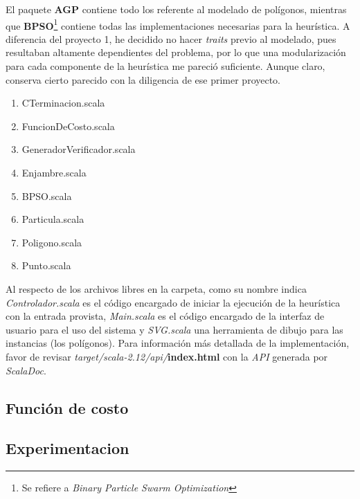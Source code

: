 \documentclass[12pt]{article}
\begin{document}
El paquete \textbf{AGP} contiene todo los referente al modelado de polígonos, mientras que \textbf{BPSO}\footnote{Se refiere a \textit{Binary Particle Swarm Optimization}} contiene todas las implementaciones necesarias para la heurística.
A diferencia del proyecto 1, he decidido no hacer \textit{traits} previo al modelado, pues resultaban
altamente dependientes del problema, por lo que una modularización para cada componente de la heurística me pareció suficiente. Aunque claro, conserva cierto parecido con la diligencia de ese primer proyecto.

\begin{multicols}{2}
\begin{enumerate}
\item CTerminacion.scala
\item FuncionDeCosto.scala
\item GeneradorVerificador.scala
\item Enjambre.scala
\item BPSO.scala
\item Particula.scala

\item Poligono.scala
\item Punto.scala
\end{enumerate}
\end{multicols}

Al respecto de los archivos libres en la carpeta, como su nombre indica \textit{Controlador.scala}
es el código encargado de iniciar la ejecución de la heurística con la entrada provista, \textit{Main.scala} es el código encargado de la interfaz de usuario para el uso del sistema y \textit{SVG.scala}
una herramienta de dibujo para las instancias (los polígonos). 
Para información más detallada de la implementación, favor de revisar
\textit{target/scala-2.12/api/}\textbf{index.html} con la \textit{API} generada por \textit{ScalaDoc}.

\subsection{Función de costo}
\subsection{Experimentacion}\label{sec:m} %
\end{document}
